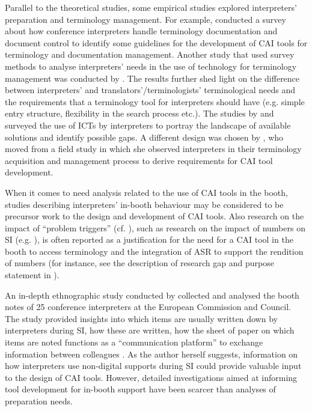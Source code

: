 Parallel to the theoretical studies, some empirical studies explored interpreters’ preparation and terminology management. For example, \citet{moser1992terminology} conducted a survey about how conference interpreters handle terminology documentation and document control to identify some guidelines for the development of CAI tools for terminology and documentation management. Another study that used survey methods to analyse interpreters’ needs in the use of technology for terminology management was conducted by \citet{bilgen2009investigating}. The results further shed light on the difference between interpreters’ and translators’\slash terminologists’ terminological needs and the requirements that a terminology tool for interpreters should have (e.g. simple entry structure, flexibility in the search process etc.). The studies by \citet{berber2010information} and \citet{pastor2016survey} surveyed the use of ICTs by interpreters to portray the landscape of available solutions and identify possible gaps. A different design was chosen by \citet{rutten2007informations}, who moved from a field study in which she observed interpreters in their terminology acquisition and management process to derive requirements for CAI tool development.

When it comes to need analysis related to the use of CAI tools in the booth, studies describing interpreters’ in-booth behaviour \citep{chmiel2008boothmates,duflou2016ing,jensen2006strategic} may be considered to be precursor work to the design and development of CAI tools. Also research on the impact of ``problem triggers'' (cf. \cite{gile2009basic}), such as research on the impact of numbers on SI (e.g. \cite{braun1996inacuracy, frittella2019a, mazza2001numbers}), is often reported as a justification for the need for a CAI tool in the booth to access terminology and the integration of ASR to support the rendition of numbers (for instance, see the description of research gap and purpose statement in \cite{defrancq2021automatic,desmet2018simultaneous,fantinuoli2017speech}).

An in-depth ethnographic study conducted by \citet{rutten2018} collected and analysed the booth notes of 25 conference interpreters at the European Commission and Council. The study provided insights into which items are usually written down by interpreters during SI, how these are written, how the sheet of paper on which items are noted functions as a ``communication platform'' to exchange information between colleagues \citep[143]{rutten2018}. As the author herself suggests, information on how interpreters use non-digital supports during SI could provide valuable input to the design of CAI tools. However, detailed investigations aimed at informing tool development for in-booth support have been scarcer than analyses of preparation needs.

